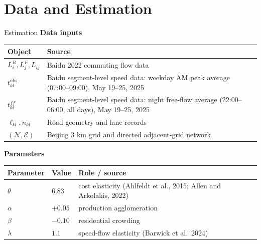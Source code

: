 \documentclass[11pt,aspectratio=169]{beamer}
\newcommand{\navfwd}[1]{\par\vspace{0.35em}\noindent\hfill\hyperlink{#1}{\beamergotobutton{details}}}
\begin{document}
\section{Data and Estimation}\label{sec:quant}
\begin{frame}[label=estparams]{Estimation}
\small
\textbf{Data inputs}
\vspace{0.25em}

\scriptsize
\begin{tabularx}{0.92\textwidth}{@{}p{}X@{}}
\toprule
Object & Source \\
\midrule
$L_i^R,L_j^F,L_{ij}$ & Baidu 2022 commuting flow data \\
$t_{kl}^{\mathrm{obs}}$ & Baidu segment-level speed data: weekday AM peak average (07:00--09:00), May 19--25, 2025 \\
$t_{kl}^{ff}$ & Baidu segment-level speed data: night free-flow average (22:00--06:00, all days), May 19--25, 2025 \\
$\ell_{kl},n_{kl}$ & Road geometry and lane records \\
$(\mathcal N,\mathcal E)$ & Beijing 3 km grid and directed adjacent-grid network \\
\bottomrule
\end{tabularx}

\vspace{1.0em}
\textbf{Parameters}
\vspace{0.25em}

\scriptsize
\begin{tabularx}{0.92\textwidth}{@{}p{}p{}X@{}}
\toprule
Parameter & Value & Role / source \\
\midrule
$\theta$ & $6.83$ & cost elasticity (Ahlfeldt et al., 2015; Allen and Arkolakis, 2022) \\
$\alpha$ & $+0.05$ & production agglomeration \\
$\beta$ & $-0.10$ & residential crowding \\
$\lambda$ & $1.1$ & speed-flow elasticity (Barwick et al.\ 2024) \\
\bottomrule
\end{tabularx}
\navfwd{appparams}
\end{frame}
\end{document}
